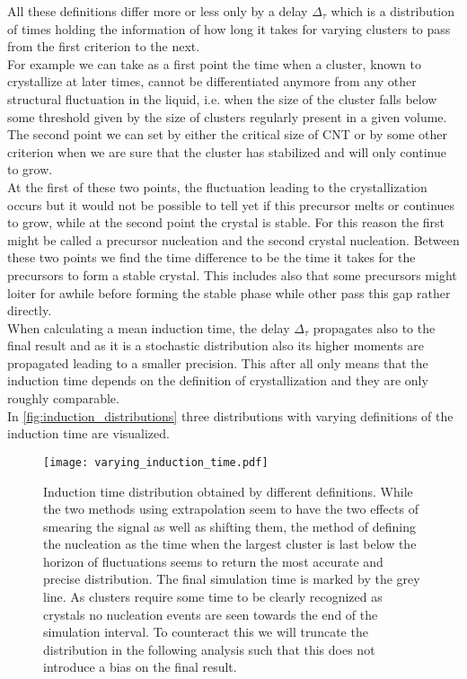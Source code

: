 All these definitions differ more or less only by a delay $\Delta_{\tau}$ which is a distribution of times holding the information of how long it takes for varying clusters to pass from the first criterion to the next.\\
For example we can take as a first point the time when a cluster, known to crystallize at later times, cannot be differentiated anymore from any other structural fluctuation in the liquid, i.e. when the size of the cluster falls below some threshold given by the size of clusters regularly present in a given volume.\\
The second point we can set by either the critical size of CNT or by some other criterion when we are sure that the cluster has stabilized and will only continue to grow.\\
At the first of these two points, the fluctuation leading to the crystallization occurs but it would not be possible to tell yet if this precursor melts or continues to grow, while at the second point the crystal is stable. For this reason the first might be called a precursor nucleation and the second crystal nucleation. Between these two points we find the time difference to be the time it takes for the precursors to form a stable crystal. This includes also that some precursors might loiter for awhile before forming the stable phase while other pass this gap rather directly.\\

When calculating a mean induction time, the delay $\Delta_{\tau}$ propagates also to the final result and as it is a stochastic distribution also its higher moments are propagated leading to a smaller precision. This after all only means that the induction time depends on the definition of crystallization and they are only roughly comparable.\\ 
In \autoref{fig:induction_distributions} three distributions with varying definitions of the induction time are visualized.

\begin{figure}[!h]
\centering
\texttt{[image: varying\_induction\_time.pdf]}
\caption[Comparison of different definitions for the induction time]{Induction time distribution obtained by different definitions. While the two methods using extrapolation seem to have the two effects of smearing the signal as well as shifting them, the method of defining the nucleation as the time when the largest cluster is last below the horizon of fluctuations seems to return the most accurate and precise distribution. The final simulation time is marked by the grey line. As clusters require some time to be clearly recognized as crystals no nucleation events are seen towards the end of the simulation interval. To counteract this we will truncate the distribution in the following analysis such that this does not introduce a bias on the final result.}
\label{fig:induction_distributions}
\end{figure}

